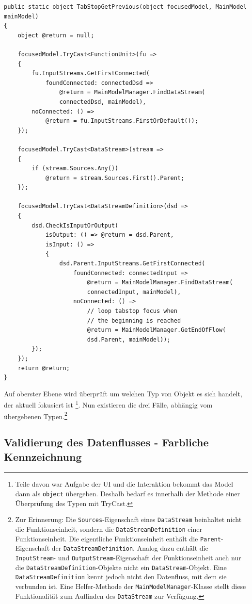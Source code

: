 \begin{enumerate}
	
\begin{lstlisting}[caption=Tabstop rückwärts]
public static object TabStopGetPrevious(object focusedModel, MainModel mainModel)
{
	object @return = null;
	
	focusedModel.TryCast<FunctionUnit>(fu => 
	{
		fu.InputStreams.GetFirstConnected(
			foundConnected: connectedDsd => 
				@return = MainModelManager.FindDataStream(
				connectedDsd, mainModel),
		noConnected: () =>
			@return = fu.InputStreams.FirstOrDefault());
	});
	
	focusedModel.TryCast<DataStream>(stream => 
	{
		if (stream.Sources.Any())
			@return = stream.Sources.First().Parent;
	});
	
	focusedModel.TryCast<DataStreamDefinition>(dsd => 
	{
		dsd.CheckIsInputOrOutput(
			isOutput: () => @return = dsd.Parent,
			isInput: () => 
			{
				dsd.Parent.InputStreams.GetFirstConnected(
					foundConnected: connectedInput =>
						@return = MainModelManager.FindDataStream(
						connectedInput, mainModel),
					noConnected: () =>
						// loop tabstop focus when
						// the beginning is reached
						@return = MainModelManager.GetEndOfFlow(
						dsd.Parent, mainModel));
		});
	});	
	return @return;
}
\end{lstlisting}
	
	

	Auf oberster Ebene wird überprüft um welchen Typ von Objekt es sich
	handelt, der aktuell fokusiert ist \footnote{Teile davon war Aufgabe der UI und die
	Interaktion bekommt das Model dann als \texttt{object} übergeben. Deshalb bedarf es
	innerhalb der Methode einer Überprüfung des Typen mit TryCast.}. Nun existieren die drei Fälle, abhängig vom übergebenen Typen.\footnote{Zur Erinnerung: Die \texttt{Sources}-Eigenschaft eines \texttt{DataStream} beinhaltet nicht die Funktionseinheit,
	sondern die \texttt{DataStreamDefinition} einer Funktionseinheit. Die eigentliche
	Funktionseinheit enthält die \texttt{Parent}-Eigenschaft der \texttt{DataStreamDefinition}.
	Analog dazu enthält die \texttt{InputStream}- und \texttt{OutputStream}-Eigenschaft der
	Funktionseinheit auch nur die \texttt{DataStreamDefinition}-Objekte nicht ein \texttt{DataStream}-Objekt.
	Eine \texttt{DataStreamDefinition} kennt jedoch nicht den Datenfluss, mit dem sie
	verbunden ist. Eine Helfer-Methode der \texttt{MainModelManager}-Klasse stellt
	diese Funktionalität zum Auffinden des \texttt{DataStream} zur Verfügung.}
\end{enumerate}

\subsection{Validierung des Datenflusses - Farbliche Kennzeichnung }

